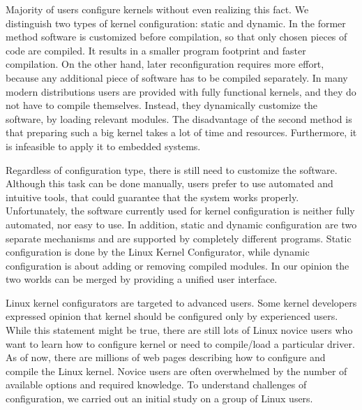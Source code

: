 \documentclass{chi2009}
\begin{document}
Majority of users configure kernels without even realizing this fact. We distinguish two types of kernel configuration: static and dynamic. In the former method software is customized before compilation, so that only chosen pieces of code are compiled. It results in a smaller program footprint and faster compilation. On the other hand, later reconfiguration requires more effort, because any additional piece of software has to be compiled separately. In many modern distributions users are provided with fully functional kernels, and they do not have to compile themselves. Instead, they dynamically customize the software, by loading relevant modules. The disadvantage of the second method is that preparing such a big kernel takes a lot of time and resources. Furthermore, it is infeasible to apply it to embedded systems.

Regardless of configuration type, there is still need to customize the software. Although this task can be done manually, users prefer to use automated and intuitive tools, that could guarantee that the system works properly. Unfortunately, the software currently used for kernel configuration is neither fully automated, nor easy to use. In addition, static and dynamic configuration are two separate mechanisms and are supported by completely different programs. Static configuration is done by the Linux Kernel Configurator, while dynamic configuration is about adding or removing compiled modules. In our opinion the two worlds can be merged by providing a unified user interface.

Linux kernel configurators are targeted to advanced users. Some kernel developers expressed opinion \cite{kernel:aunt:2002} that kernel should be configured only by experienced users. While this statement might be true, there are still lots of Linux novice users who want to learn how to configure kernel or need to compile/load a particular driver. As of now, there are millions of web pages describing how to configure and compile the Linux kernel. Novice users are often overwhelmed by the number of available options and required knowledge. To understand challenges of configuration, we carried out an initial study on a group of Linux users.
\end{document}
